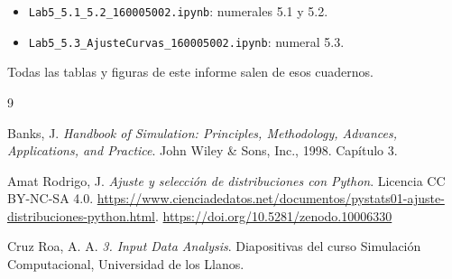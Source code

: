 \documentclass[11pt,letterpaper]{article}
\newcommand{\codigoEstudiante}{160005002}
\begin{document}
\begin{itemize}[itemsep=1pt]
\item \texttt{Lab5\_5.1\_5.2\_\codigoEstudiante.ipynb}: numerales 5.1 y 5.2.
\item \texttt{Lab5\_5.3\_AjusteCurvas\_\codigoEstudiante.ipynb}: numeral 5.3.
\end{itemize}

Todas las tablas y figuras de este informe salen de esos cuadernos.

\begin{thebibliography}{9}

Banks, J. \emph{Handbook of Simulation: Principles, Methodology, Advances, Applications, and Practice}. John Wiley
\& Sons, Inc., 1998. Capítulo 3.

Amat Rodrigo, J. \emph{Ajuste y selección de distribuciones con Python}. Licencia CC BY-NC-SA 4.0.
\url{https://www.cienciadedatos.net/documentos/pystats01-ajuste-distribuciones-python.html}.
\url{https://doi.org/10.5281/zenodo.10006330}

Cruz Roa, A. A. \emph{3. Input Data Analysis}. Diapositivas del curso Simulación Computacional, Universidad de los
Llanos.

\end{thebibliography}
\end{document}
